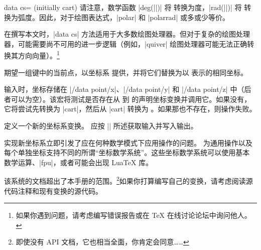 \begin{pgfplotskey}{data cs= (initially cart)}
    请注意，数学函数 |deg(||)| 将  转换为度，|rad(||)| 将  转换为弧度。因此，对于绘图表达式，|polar| 和 |polarrad| 或多或少等价。

\begin{codeexample}[]
\end{codeexample}

    在撰写本文时，|data cs| 方法适用于大多数绘图处理器。但对于复杂的绘图处理器，可能需要尚不可用的进一步逻辑（例如，|quiver| 绘图处理器可能无法正确转换其方向向量）。\footnote{如果你遇到问题，请考虑编写错误报告或在 \TeX{} 在线讨论论坛中询问他人。}
\end{pgfplotskey}

\begin{command}{\pgfplotsaxistransformcs{}}
    期望一组键中的当前点，以坐标系  提供，并将它们替换为以  表示的相同坐标。

    输入时，坐标存储在 |/data point/x|、|/data point/y| 和 |/data point/z| 中（后者可以为空）。该宏将测试是否存在从  到  的声明坐标变换并调用它。如果没有，它将尝试先转换为 |cart|，然后从 |cart| 转换为 。如果那也不存在，则操作失败。
\end{command}

\begin{command}{\pgfplotsdefinecstransform{}}
    定义一个新的坐标系变换。 应按 |\pgfplotsaxistransformcs| 所述获取输入并写入输出。

    实现新坐标系立即引发了应在何种数学模式下应用操作的问题。\PGFPlots{} 为通用操作以及每个单独坐标支持不同的所谓“坐标数学系统”。这些坐标数学系统可以使用基本 \PGF{} 数学运算、|fpu|，或者可能会出现 Lua\TeX{} 库。

    该系统的文档超出了本手册的范围。\footnote{即使没有 API 文档，它也相当全面，你肯定会同意……}如果你打算编写自己的变换，请考虑阅读源代码注释和现有变换的源代码。
\end{command}


